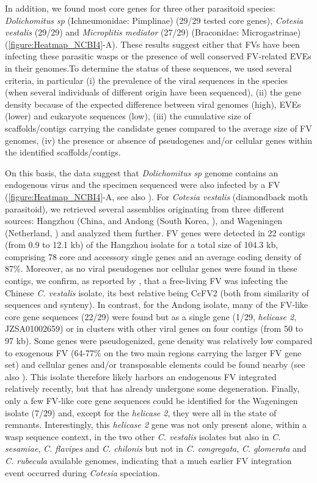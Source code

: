 In addition, we found most core genes for three other parasitoid species: \textit{Dolichomitus sp} (Ichneumonidae: Pimplinae) (29/29 tested core genes), \textit{Cotesia vestalis} (29/29) and \textit{Microplitis mediator} (27/29) (Braconidae: Microgastrinae)
(\figurename{\ref{figure:Heatmap_NCBI4}}-A). These results suggest either that FVs have been infecting these parasitic wasps or the presence of well conserved FV-related EVEs in their genomes.To determine the status of these sequences, we used several criteria, in particular (i) the prevalence of the viral sequences in the species (when several individuals of different origin have been sequenced), (ii) the gene density because of the expected difference between viral genomes (high), EVEs (lower) and eukaryote sequences (low), (iii) the cumulative size of scaffolds/contigs carrying the candidate genes compared to the average size of FV genomes, (iv) the presence or absence of pseudogenes and/or cellular genes within the identified scaffolds/contigs. 

On this basis, the data suggest that \textit{Dolichomitus sp} genome contains an endogenous virus and the specimen sequenced were also infected by a FV (\figurename{\ref{figure:Heatmap_NCBI4}}-A, see also \citep{burke_presence_2021}). For \textit{Cotesia vestalis} (diamondback moth parasitoid), we retrieved several assemblies originating from three different sources: Hangzhou (China, \citep{shi_genomes_2019} and Andong (South Korea, \citep{burke_presence_2021}), and Wageningen (Netherland, \citep{gauthier_chromosomal_2021}) and analyzed them further. FV genes were detected in 22 contigs (from 0.9 to 12.1 kb) of the Hangzhou isolate for a total size of 104.3 kb, comprising 78 core and accessory single genes and an average coding density of 87\%. Moreover, as no viral pseudogenes nor cellular genes were found in these contigs, we confirm, as reported by \cite{burke_presence_2021}, that a free-living FV was infecting the Chinese \textit{C. vestalis} isolate, its best relative being CcFV2 (both from similarity of sequences and synteny). In contrast, for the Andong isolate, many of the FV-like core gene sequences (22/29) were found but as a single gene (1/29, \textit{helicase 2}, JZSA01002659) or in clusters with other viral genes on four contigs (from 50 to 97 kb). Some genes were pseudogenized, gene density was relatively low compared to exogenous FV (64-77\% on the two main regions carrying the larger FV gene set) and cellular genes and/or transposable elements could be found nearby (see also \citep{burke_presence_2021}). This isolate therefore likely harbors an endogenous FV integrated relatively recently, but that has already undergone some degeneration. Finally, only a few FV-like core gene sequences could be identified for the Wageningen isolate (7/29) and, except for the \textit{helicase 2}, they were all in the state of remnants. Interestingly, this \textit{helicase 2} gene was not only present alone, within a wasp sequence context, in the two other \textit{C. vestalis} isolates but also in \textit{C. sesamiae}, \textit{C. flavipes} and \textit{C. chilonis} but not in \textit{C. congregata}, \textit{C. glomerata} and \textit{C. rubecula} available genomes, indicating that a much earlier FV integration event occurred  during \textit{Cotesia} speciation.

